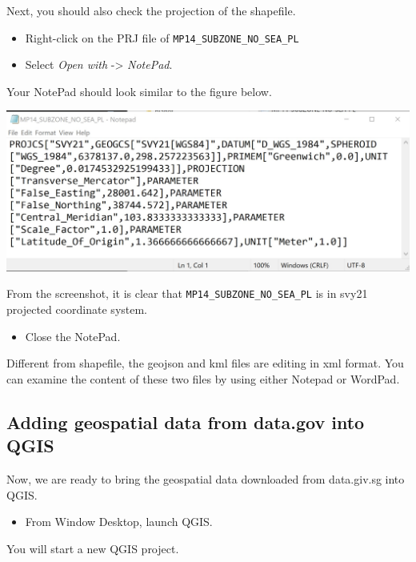\documentclass[
  letterpaper,
  DIV=11,
  numbers=noendperiod]{scrreprt}
\providecommand{\tightlist}{%
  \setlength{\itemsep}{0pt}\setlength{\parskip}{0pt}}\usepackage{longtable,booktabs,array}
\begin{document}
Next, you should also check the projection of the shapefile.

\begin{itemize}
\tightlist
\item
  Right-click on the PRJ file of \texttt{MP14\_SUBZONE\_NO\_SEA\_PL}
\item
  Select \emph{Open with} -\textgreater{} \emph{NotePad}.
\end{itemize}

Your NotePad should look similar to the figure below.

\includegraphics{./img02/image3.jpg}

From the screenshot, it is clear that
\texttt{MP14\_SUBZONE\_NO\_SEA\_PL} is in svy21 projected coordinate
system.

\begin{itemize}
\tightlist
\item
  Close the NotePad.
\end{itemize}

Different from shapefile, the geojson and kml files are editing in xml
format. You can examine the content of these two files by using either
Notepad or WordPad.

\hypertarget{adding-geospatial-data-from-data.gov-into-qgis}{%
\subsection{Adding geospatial data from data.gov into
QGIS}\label{adding-geospatial-data-from-data.gov-into-qgis}}

Now, we are ready to bring the geospatial data downloaded from
data.giv.sg into QGIS.

\begin{itemize}
\tightlist
\item
  From Window Desktop, launch QGIS.
\end{itemize}

You will start a new QGIS project.
\end{document}
